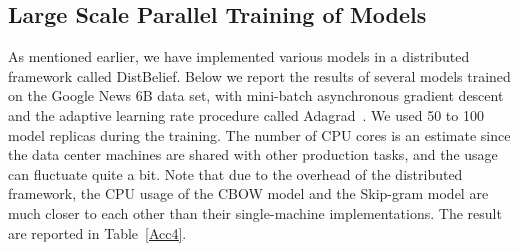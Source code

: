 \documentclass{article} %
\begin{document}
\subsection{Large Scale Parallel Training of Models}


As mentioned earlier, we have implemented various models in a
distributed framework called DistBelief. Below we report the
results of several models trained on the Google News 6B data set, with
mini-batch asynchronous gradient descent and the adaptive
learning rate procedure called Adagrad~\cite{AdaGrad}. We used 50 to 100 model
replicas during the training. %
The number
of CPU cores is an estimate since the data center machines
are shared with other production tasks, and the usage can fluctuate
quite a bit. Note that due to the overhead of the distributed
framework, the CPU usage of the CBOW model and the Skip-gram model are
much closer to each other than their single-machine
implementations. The result are reported in Table~\ref{Acc4}.

%
%
\end{document}
